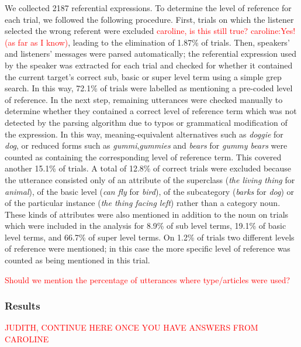 \documentclass[11pt]{article}
\newcommand{\red}[1]{\textcolor{Red}{#1}}
\begin{document}
We collected 2187 referential expressions. To determine the level of reference for each trial, we followed the following procedure. First, trials on which the listener selected the wrong referent were excluded \red{caroline, is this still true? caroline:Yes! (as far as I know)}, leading to the elimination of 1.87\% of trials. Then, speakers' and listeners' messages were parsed automatically; the referential expression used by the speaker was extracted for each trial and checked for whether it contained the current target's correct sub, basic or super level term using a simple grep search. In this way, 72.1\% of trials were labelled as mentioning a pre-coded level of reference. In the next step, remaining utterances were checked manually to determine whether they contained a correct level of reference term which was not detected by the parsing algorithm due to typos or grammatical modification of the expression. In this way, meaning-equivalent alternatives such as \emph{doggie} for \emph{dog}, or reduced forms such as \emph{gummi},\emph{gummies} and \emph{bears} for \emph{gummy bears} were counted as containing the corresponding level of reference term. This covered another 15.1\% of trials. A total of 12.8\% of correct trials were excluded because the utterance consisted only of an attribute of the superclass (\emph{the living thing} for \emph{animal}), of the basic level (\emph{can fly} for \emph{bird}), of the subcategory (\emph{barks} for \emph{dog}) or of the particular instance (\emph{the thing facing left}) rather than a category noun. These kinds of attributes were also mentioned in addition to the noun on trials which were included in the analysis for 8.9\% of sub level terms, 19.1\% of basic level terms, and 66.7\% of super level terms. On 1.2\% of trials two different levels of reference were mentioned; in this case the more specific level of reference was counted as being mentioned in this trial.

\red{Should we mention the percentage of utterances where type/articles were used?}

\subsubsection{Results}

\red{JUDITH, CONTINUE HERE ONCE YOU HAVE ANSWERS FROM CAROLINE}
\end{document}
